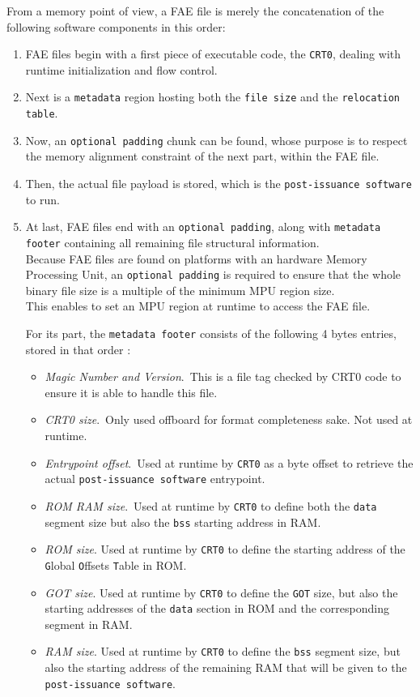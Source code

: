 \documentclass[10pt,a4paper,titlepage]{refart}
\begin{document}
From a memory point of view, a FAE file is merely the concatenation of the following software components in this order:
\begin{enumerate}
    \item FAE files begin with a first piece of executable code, the \texttt{CRT0}, dealing with runtime initialization and flow control.
    \item Next is a \texttt{metadata} region hosting both the \texttt{file size} and the \texttt{relocation table}.
    \item Now, an \texttt{optional padding} chunk can be found, whose purpose is to respect the memory alignment constraint of the next part, within the FAE file.
    \item Then, the actual file payload is stored, which is the \texttt{post-issuance software} to run.
    \item At last, FAE files end with an \texttt{optional padding}, along with \texttt{metadata footer} containing all remaining file structural information.\\
    Because FAE files are found on platforms with an hardware Memory Processing Unit, an \texttt{optional padding} is required to ensure that the whole binary file size is a multiple of the minimum MPU region size.\\
    This enables to set an MPU region at runtime to access the FAE file.

    For its part, the \texttt{metadata footer} consists of the following 4 bytes entries, stored in that order :
    \begin{itemize}
        \item \textit{Magic Number and Version}.\
               This is a file tag checked by CRT0 code to ensure it is able to handle this file.
        \item \textit{CRT0 size}.\
                Only used offboard for format completeness sake. Not used at runtime.
        \item \textit{Entrypoint offset}.\
                Used at runtime by \texttt{CRT0} as a byte offset to retrieve the actual \texttt{post-issuance software} entrypoint.
        \item \textit{ROM RAM size}.\
                Used at runtime by \texttt{CRT0} to define both the \texttt{data} segment size but also the \texttt{bss} starting address in RAM.
        \item \textit{ROM size}.
                Used at runtime by \texttt{CRT0} to define the starting address of the \texttt{G}lobal \texttt{O}ffsets \texttt{T}able in ROM.
        \item \textit{GOT size}.
                Used at runtime by \texttt{CRT0} to define the \texttt{GOT} size, but also the starting addresses of the \texttt{data} section in ROM and the corresponding segment in RAM.
        \item \textit{RAM size}.
                Used at runtime by \texttt{CRT0} to define the \texttt{bss} segment size, but also the starting address of the remaining RAM that will be given to the \texttt{post-issuance software}.
    \end{itemize}
\end{enumerate}
\end{document}
